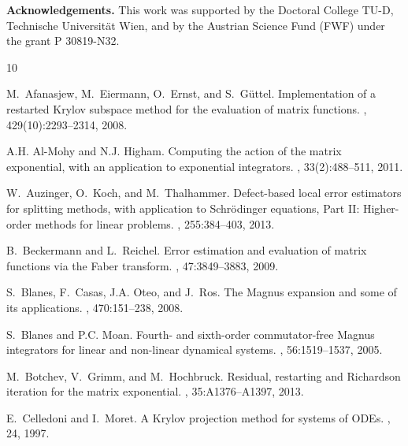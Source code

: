\documentclass[smallextended]{svjour3pre}%
\numberwithin{equation}{section}
\numberwithin{figure}{section}
\numberwithin{table}{section}
\begin{document}
\bigskip\noindent
{\textbf{Acknowledgements.}}
This work was supported by the Doctoral College TU-D,
Technische Universit{\"a}t Wien,
and by the Austrian Science Fund (FWF) under the grant P 30819-N32.

%
%

\begin{thebibliography}{10}

M.~Afanasjew, M.~Eiermann, O.~Ernst, and S.~G{\"u}ttel.
\newblock Implementation of a restarted {K}rylov subspace method for the
  evaluation of matrix functions.
, 429(10):2293--2314, 2008.

A.H. Al-Mohy and N.J. Higham.
\newblock Computing the action of the matrix exponential, with an application
  to exponential integrators.
, 33(2):488--511, 2011.

W.~Auzinger, O.~Koch, and M.~Thalhammer.
\newblock Defect-based local error estimators for splitting methods, with
  application to {S}chr\"{o}dinger equations, {P}art {II}: Higher-order methods
  for linear problems.
, 255:384--403, 2013.

B.~Beckermann and L.~Reichel.
\newblock Error estimation and evaluation of matrix functions via the {F}aber
  transform.
, 47:3849--3883, 2009.

S.~Blanes, F.~Casas, J.A. Oteo, and J.~Ros.
\newblock The {M}agnus expansion and some of its applications.
, 470:151--238, 2008.

S.~Blanes and P.C. Moan.
\newblock Fourth- and sixth-order commutator-free {M}agnus integrators for
  linear and non-linear dynamical systems.
, 56:1519--1537, 2005.

M.~Botchev, V.~Grimm, and M.~Hochbruck.
\newblock Residual, restarting and {R}ichardson iteration for the matrix
  exponential.
, 35:A1376--A1397, 2013.

E.~Celledoni and I.~Moret.
\newblock A {K}rylov projection method for systems of {ODE}s.
, 24, 1997.


\end{thebibliography}
\end{document}
